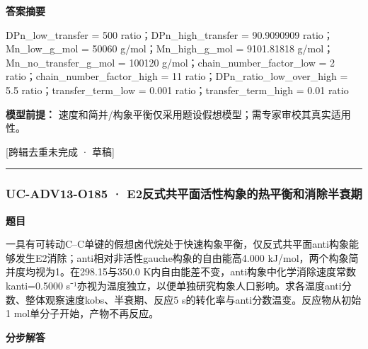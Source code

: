 \documentclass[UTF8,11pt,a4paper]{ctexart}
\begin{document}
\noindent\textbf{答案摘要}\par
DPn\_low\_transfer = 500 ratio；DPn\_high\_transfer = 90.9090909 ratio；Mn\_low\_g\_mol = 50060 g/mol；Mn\_high\_g\_mol = 9101.81818 g/mol；Mn\_no\_transfer\_g\_mol = 100120 g/mol；chain\_number\_factor\_low = 2 ratio；chain\_number\_factor\_high = 11 ratio；DPn\_ratio\_low\_over\_high = 5.5 ratio；transfer\_term\_low = 0.001 ratio；transfer\_term\_high = 0.01 ratio\par
\noindent\textbf{模型前提：}
速度和简并/构象平衡仅采用题设假想模型；需专家审校其真实适用性。\par
\noindent\textcolor{red!65!black}{[跨辑去重未完成 · 草稿]} \par
\medskip\hrule\medskip
{}
\subsubsection*{UC-ADV13-O185 · E2反式共平面活性构象的热平衡和消除半衰期}
\noindent\textbf{题目}\par
一具有可转动C–C单键的假想卤代烷处于快速构象平衡，仅反式共平面anti构象能够发生E2消除；anti相对非活性gauche构象的自由能高4.000 kJ/mol，两个构象简并度均视为1。在298.15与350.0 K内自由能差不变，anti构象中化学消除速度常数kanti=0.5000 s⁻¹亦视为温度独立，以便单独研究构象人口影响。求各温度anti分数、整体观察速度kobs、半衰期、反应5 s的转化率与anti分数温变。反应物从初始1 mol单分子开始，产物不再反应。\par
\medskip\noindent\textbf{分步解答}
\end{document}
